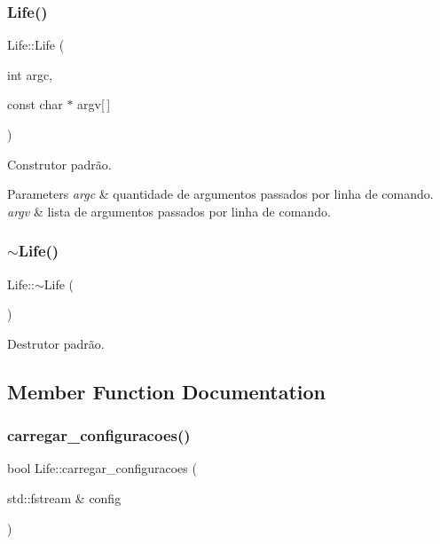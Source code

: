 \subsubsection{Life()}
{\footnotesize\ttfamily Life\+::\+Life (\begin{DoxyParamCaption}\item[{int}]{argc,  }\item[{const char $\ast$}]{argv[$\,$] }\end{DoxyParamCaption})\hspace{0.3cm}{\ttfamily [inline]}}

Construtor padrão. 
\begin{DoxyParams}{Parameters}
{\em argc} & quantidade de argumentos passados por linha de comando. \\
\hline
{\em argv} & lista de argumentos passados por linha de comando. \\
\hline
\end{DoxyParams}
\mbox{\label{class_life_ab37ae74b41b2bc3467d9596e42081bc9}} 
\subsubsection{$\sim$\+Life()}
{\footnotesize\ttfamily Life\+::$\sim$\+Life (\begin{DoxyParamCaption}{ }\end{DoxyParamCaption})\hspace{0.3cm}{\ttfamily [default]}}

Destrutor padrão. 

\subsection{Member Function Documentation}
\mbox{\label{class_life_a31d469adc94d3834453ea8f278e02534}} 
\subsubsection{carregar\+\_\+configuracoes()}
{\footnotesize\ttfamily bool Life\+::carregar\+\_\+configuracoes (\begin{DoxyParamCaption}\item[{std\+::fstream \&}]{config }\end{DoxyParamCaption})}

